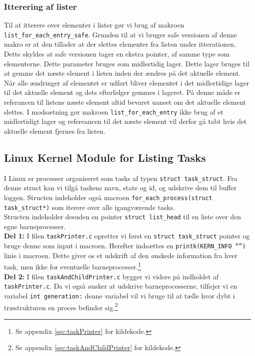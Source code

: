 \documentclass[main.tex]{subfile}
\begin{document}
\subsubsection*{Itterering af lister}
Til at itterere over elementer i lister gør vi brug af makroen \texttt{list\_for\_each\_entry\_safe}. Grunden til at vi bruger safe versionen af denne makro er at den tillader at der slettes elementer fra listen under itterationen. Dette skyldes at safe versionen tager en ekstra pointer, af samme type som elementerne. Dette parameter bruges som midlertidig lager. Dette lager bruges til at gemme det næste element i listen inden der ændres på det aktuelle element. Når alle ændringer af elementet er udført bliver elementet i det midlertidige lager til det aktuelle element og dets efterfølger gemmes i lageret. På denne måde er referancen til listens næste element altid bevaret uanset om det aktuelle element slettes. I modsætning gør makroen \texttt{list\_for\_each\_entry} ikke brug af et midlertidigt lager og refereancen til det næste element vil derfor gå tabt hvis det aktuelle element fjernes fra listen.

\subsection{Linux Kernel Module for Listing Tasks}
I Linux er processer organiseret som tasks af typen \texttt{struct task\_struct}. Fra denne struct kan vi tilgå taskens navn, state og id, og udskrive dem til buffer loggen. Structen indeholder også macroen \texttt{for\_each\_process(struct task\_struct*)} som iterere over alle igangværende tasks.\\

Structen indeholder desuden en pointer \texttt{struct list\_head} til en liste over den egne barneprocesser.\\

\textbf{Del 1:} I filen \texttt{taskPrinter.c} opretter vi først en \texttt{struct task\_struct} pointer og bruge denne som input i macroen. Herefter indsættes en \texttt{printk(KERN\_INFO “”)} linie i macroen. Dette giver os et udskrift af den ønskede information fra hver task, men ikke for eventuelle barneprocesser.\footnote{Se appendix \ref{sec:taskPrinter} for kildekode.}\\

\textbf{Del 2:} I filen \texttt{taskAndChildPrinter.c} bygger vi videre på indholdet af \texttt{taskPrinter.c}. Da vi også ønsker at udskrive barneprocesserne, tilføjer vi en variabel \texttt{int generation:} denne variabel vil vi bruge til at tælle hvor dybt i træstrukturen en proces befinder sig.\footnote{Se appendix \ref{sec:taskAndChildPrinter} for kildekode.}\\
\end{document}

